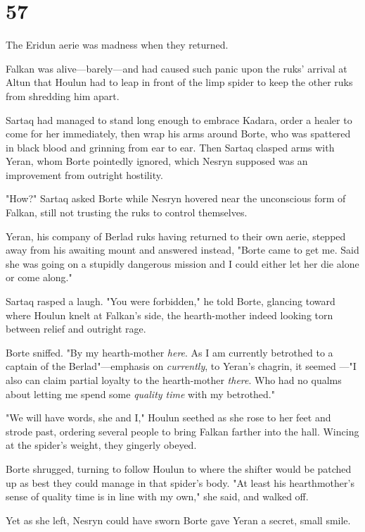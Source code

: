 
\chapter{57}

The Eridun aerie was madness when they returned.

Falkan was alive---barely---and had caused such panic upon the ruks' arrival at Altun that Houlun had to leap in front of the limp spider to keep the other ruks from shredding him apart.

Sartaq had managed to stand long enough to embrace Kadara, order a healer to come for her immediately, then wrap his arms around Borte, who was spattered in black blood and grinning from ear to ear. Then Sartaq clasped arms with Yeran, whom Borte pointedly ignored, which Nesryn supposed was an improvement from outright hostility.

"How?" Sartaq asked Borte while Nesryn hovered near the unconscious form of Falkan, still not trusting the ruks to control themselves.

Yeran, his company of Berlad ruks having returned to their own aerie, stepped away from his awaiting mount and answered instead, "Borte came to get me. Said she was going on a stupidly dangerous mission and I could either let her die alone or come along."

Sartaq rasped a laugh. "You were forbidden," he told Borte, glancing toward where Houlun knelt at Falkan's side, the hearth-mother indeed looking torn between relief and outright rage.

Borte sniffed. "By my hearth-mother \emph{here}. As I am currently betrothed to a captain of the Berlad"---emphasis on \emph{currently}, to Yeran's chagrin, it seemed ---"I also can claim partial loyalty to the hearth-mother \emph{there}. Who had no qualms about letting me spend some \emph{quality time} with my betrothed."

"We will have words, she and I," Houlun seethed as she rose to her feet and strode past, ordering several people to bring Falkan farther into the hall. Wincing at the spider's weight, they gingerly obeyed.

Borte shrugged, turning to follow Houlun to where the shifter would be patched up as best they could manage in that spider's body. "At least his hearthmother's sense of quality time is in line with my own," she said, and walked off.

Yet as she left, Nesryn could have sworn Borte gave Yeran a secret, small smile.

